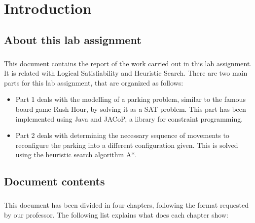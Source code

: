 \chapter{Introduction}
\label{chapter: introduction}

\section{About this lab assignment}

\paragraph{}
This document contains the report of the work carried out in this lab assignment. It is related with Logical Satisfiability and Heuristic Search. There are two main parts for this lab assignment, that are organized as follows:

\begin{itemize}
	\item Part 1 deals with the modelling of a parking problem, similar to the famous board game Rush Hour, by solving it as a SAT problem. This part has been implemented using Java and JACoP,  a library for constraint programming.
    
	\item Part 2 deals with determining the necessary sequence of movements to reconfigure the parking into a different configuration given. This is solved using the heuristic search algorithm A*.
    
\end{itemize}

\section{Document contents}

\paragraph{}
This document has been divided in four chapters, following the format requested by our professor. The following list explains what does each chapter show:

